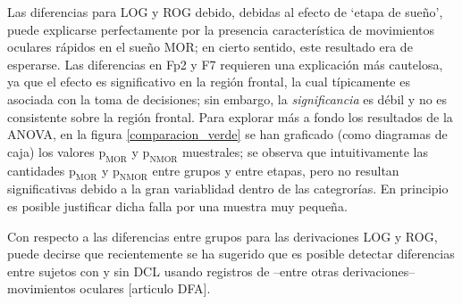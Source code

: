 \documentclass[12pt,letterpaper]{book}
\begin{document}
Las diferencias para LOG y ROG debido, debidas al efecto de `etapa de sueño', puede explicarse perfectamente por la presencia característica de movimientos oculares rápidos en el sueño MOR; en cierto sentido, este resultado era de esperarse.
%
Las diferencias en Fp2 y F7 requieren una explicación más cautelosa, ya que el efecto es significativo en la región frontal, la cual típicamente es asociada con la toma de decisiones; sin embargo, la \textit{significancia} es débil y no es consistente sobre la región frontal.
%
Para explorar más a fondo los resultados de la ANOVA, en la figura \ref{comparacion_verde} se han graficado (como diagramas de caja) los valores $\text{p}_{\text{MOR}}$ y $\text{p}_{\text{NMOR}}$ muestrales; se observa que intuitivamente las cantidades $\text{p}_{\text{MOR}}$ y $\text{p}_{\text{NMOR}}$ entre grupos y entre etapas, pero no resultan significativas debido a la gran variablidad dentro de las categrorías.
%
En principio es posible justificar dicha falla por una muestra muy pequeña.

Con respecto a las diferencias entre grupos para las derivaciones LOG y ROG, puede decirse que recientemente se ha sugerido que es posible detectar diferencias entre sujetos con y sin DCL usando registros de --entre otras derivaciones-- movimientos oculares [articulo DFA].
\end{document}

